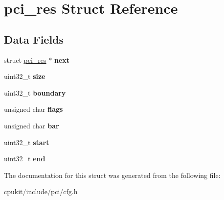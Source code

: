 \hypertarget{structpci__res}{}\section{pci\+\_\+res Struct Reference}
\label{structpci__res}
\subsection*{Data Fields}
\begin{DoxyCompactItemize}
\item 
\mbox{\label{structpci__res_a9aae4e27f9210a2cc30d03893c6f937a}} 
struct \mbox{\hyperlink{structpci__res}{pci\+\_\+res}} $\ast$ {\bfseries next}
\item 
\mbox{\label{structpci__res_a02eb123d3d03171465c8ed65917fb4a5}} 
uint32\+\_\+t {\bfseries size}
\item 
\mbox{\label{structpci__res_adf88e9e8d9ecd4ffd8ddef166e0f3e02}} 
uint32\+\_\+t {\bfseries boundary}
\item 
\mbox{\label{structpci__res_afc7f1f502bbc8fd6e5a50c21f75933b5}} 
unsigned char {\bfseries flags}
\item 
\mbox{\label{structpci__res_aba36509b6be7193fa492463f1be6371d}} 
unsigned char {\bfseries bar}
\item 
\mbox{\label{structpci__res_a17ec0077ef16915f50b7bc879a039bca}} 
uint32\+\_\+t {\bfseries start}
\item 
\mbox{\label{structpci__res_a0f98806610a8224e263fc8f370631883}} 
uint32\+\_\+t {\bfseries end}
\end{DoxyCompactItemize}


The documentation for this struct was generated from the following file\+:\begin{DoxyCompactItemize}
\item 
cpukit/include/pci/cfg.\+h\end{DoxyCompactItemize}
